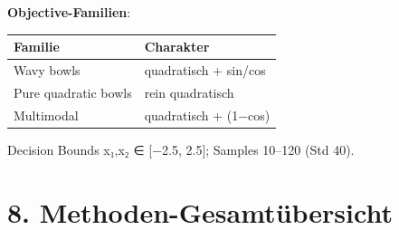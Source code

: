 \documentclass[11pt, a4paper]{article}
\begin{document}
\textbf{Objective-Familien}:



{\small
\begin{tabularx}{\linewidth}{XX}
\hline
\rowcolor{tableheadbg}
{\color{white}\textbf{Familie}} & {\color{white}\textbf{Charakter}} \\[2pt]
\hline
\endhead
\hline
\endfoot
Wavy bowls & quadratisch + sin/cos \\
Pure quadratic bowls & rein quadratisch \\
Multimodal & quadratisch + (1−cos) \\
\end{tabularx}
}


Decision Bounds x₁,x₂ ∈ [−2.5, 2.5]; Samples 10–120 (Std 40).



\section{8. Methoden-Gesamtübersicht}
\end{document}
